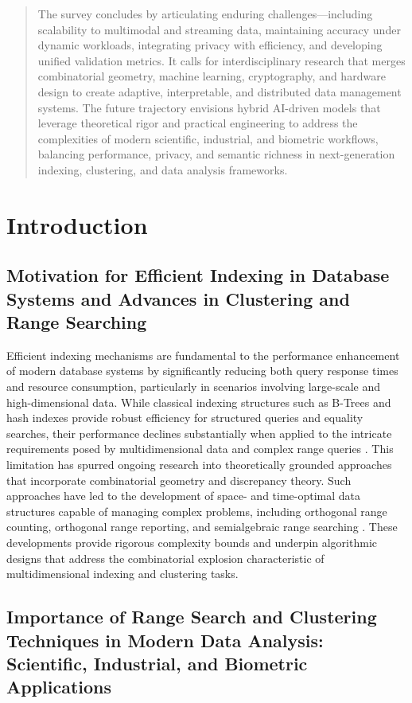 \documentclass[11pt]{article}
\begin{document}
\begin{abstract}
The survey concludes by articulating enduring challenges—including scalability to multimodal and streaming data, maintaining accuracy under dynamic workloads, integrating privacy with efficiency, and developing unified validation metrics. It calls for interdisciplinary research that merges combinatorial geometry, machine learning, cryptography, and hardware design to create adaptive, interpretable, and distributed data management systems. The future trajectory envisions hybrid AI-driven models that leverage theoretical rigor and practical engineering to address the complexities of modern scientific, industrial, and biometric workflows, balancing performance, privacy, and semantic richness in next-generation indexing, clustering, and data analysis frameworks.
\end{abstract}\section{Introduction}

\subsection{Motivation for Efficient Indexing in Database Systems and Advances in Clustering and Range Searching}

Efficient indexing mechanisms are fundamental to the performance enhancement of modern database systems by significantly reducing both query response times and resource consumption, particularly in scenarios involving large-scale and high-dimensional data. While classical indexing structures such as B-Trees and hash indexes provide robust efficiency for structured queries and equality searches, their performance declines substantially when applied to the intricate requirements posed by multidimensional data and complex range queries \cite{ref31}. This limitation has spurred ongoing research into theoretically grounded approaches that incorporate combinatorial geometry and discrepancy theory. Such approaches have led to the development of space- and time-optimal data structures capable of managing complex problems, including orthogonal range counting, orthogonal range reporting, and semialgebraic range searching \cite{ref1}. These developments provide rigorous complexity bounds and underpin algorithmic designs that address the combinatorial explosion characteristic of multidimensional indexing and clustering tasks.

\subsection{Importance of Range Search and Clustering Techniques in Modern Data Analysis: Scientific, Industrial, and Biometric Applications}
\end{document}
